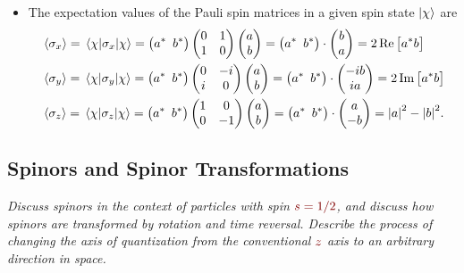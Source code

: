 \documentclass[11pt, a4paper]{article}
\newcommand{\qmath}[1]{\textcolor{Maroon}{#1}}  %
\begin{document}
\begin{itemize}
	\item The expectation values of the Pauli spin matrices in a given spin state $ \ket{\chi} $ are
	\begin{align*}
		& \ev{\sigma_{x}} = \mel{\chi}{\sigma_{x}}{\chi} = \big(a^{*} \, \ b^{*}\big) 
		\begin{pmatrix}
			0 & 1\\
			1 & 0
		\end{pmatrix}
		\begin{pmatrix}
			a\\
			b
		\end{pmatrix}
			= \big(a^{*} \, \ b^{*}\big)\cdot 
		\begin{pmatrix}
			b\\
			a
		\end{pmatrix}
		= 2 \Re \big[a^{*}b\big]\\
		& \ev{\sigma_{y}} = \mel{\chi}{\sigma_{y}}{\chi} = \big(a^{*} \, \ b^{*}\big) 
		\begin{pmatrix}
			0 & -i\\
			i & 0
		\end{pmatrix}
		\begin{pmatrix}
			a\\
			b
		\end{pmatrix}
			= \big(a^{*} \, \ b^{*}\big)\cdot 
		\begin{pmatrix}
			-ib\\
			ia
		\end{pmatrix}
		= 2 \Im \big[a^{*}b\big]\\
		& \ev{\sigma_{z}} = \mel{\chi}{\sigma_{z}}{\chi} = \big(a^{*} \, \ b^{*}\big) 
		\begin{pmatrix}
			1 & 0\\
			0 & -1
		\end{pmatrix}
		\begin{pmatrix}
			a\\
			b
		\end{pmatrix}
			= \big(a^{*} \, \ b^{*}\big)\cdot 
		\begin{pmatrix}
			a\\
			-b
		\end{pmatrix}
		= \abs{a}^{2} - \abs{b}^{2}.
	\end{align*}

\end{itemize}

\subsection{Spinors and Spinor Transformations}
\textit{Discuss spinors in the context of particles with spin $ \qmath{s = 1/2} $, and discuss how spinors are transformed by rotation and time reversal. Describe the process of changing the axis of quantization from the conventional $ \qmath{z} $ axis to an arbitrary direction in space.}
\end{document}
